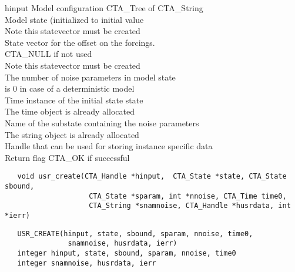 \horzline
\begin{tabbing}
\functab
{}
 {hinput}    {Model configuration CTA\_Tree of CTA\_String}\\
     {Model state (initialized to initial value}\\
\funcline{}   {}          {Note this statevector must be created}\\
    {State vector for the offset on the forcings.}\\
\funcline{}   {}          {CTA\_NULL if not used}\\
\funcline{}   {}          {Note this statevector must be created}\\
    {The number of noise parameters in model state}\\
\funcline{}   {}          {is 0 in case of a deterministic model}\\
     {Time instance of the initial state state}\\
\funcline{}   {}          {The time object is already allocated}\\
 {Name of the substate containing the noise parameters}\\
\funcline{}   {}          {The string object is already allocated}\\
  {Handle that can be used for storing instance specific data}\\
      {Return flag CTA\_OK if successful}\\


\end{tabbing}
\horzline

\begin{verbatim}
   void usr_create(CTA_Handle *hinput,  CTA_State *state, CTA_State sbound, 
                    CTA_State *sparam, int *nnoise, CTA_Time time0, 
                    CTA_String *snamnoise, CTA_Handle *husrdata, int *ierr)
\end{verbatim}

\begin{verbatim}
   USR_CREATE(hinput, state, sbound, sparam, nnoise, time0, 
               snamnoise, husrdata, ierr)
   integer hinput, state, sbound, sparam, nnoise, time0 
   integer snamnoise, husrdata, ierr
\end{verbatim}

